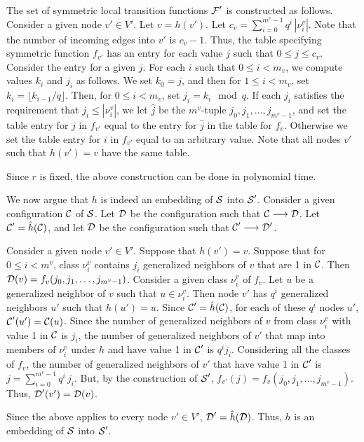 The set of symmetric local transition functions $\mbox{$\mathcal{F}$}'$ is constructed as follows.
Consider a given node $v' \in V'$. Let $v = h(v')$.
Let $c_v = \sum_{i=0}^{m^v-1} q^i \, |\nu_i^v|$.
Note that the number of incoming edges into $v'$ is 
$c_v -1$.
Thus, the table specifying symmetric function $f_{v'}$
has an entry for each value $j$ such that $0 \leq j \leq c_v$.
Consider the entry for a given $j$.
For each $i$ such that $0 \leq i < m_v$,
we compute values $k_i$ and $j_i$ as follows.
We set $k_0 =j$, and then for $1 \leq i < m_v$,
set $k_i = \lfloor k_{i-1}/q \rfloor$.
Then, for $0 \leq i < m_v$, set $j_i = k_i \mod q$.
If each $j_i$ satisfies the requirement that $j_i \leq | \nu_i^v |$,
we let $\hat{j}$ be the $m^v$-tuple $j_0,  j_1, \ldots , j_{m^v -1}$,
and set the table entry for $j$ in $f_{v'}$ equal to the entry for $\hat{j}$ 
 in the table for $f_v$.
Otherwise we set the table entry for $i$ in $f_{v'}$ equal to an arbitrary value.
Note that all nodes $v'$ such that $h(v')=v$ have the same table.

Since $r$ is fixed, the above construction can be done in polynomial time.

We now argue that $h$ is indeed an embedding of $\mbox{$\mathcal{S}$}$ into $\mbox{$\mathcal{S}$}'$.
Consider a given configuration $\mbox{$\mathcal{C}$}$ of $\mbox{$\mathcal{S}$}$.
Let $\mbox{$\mathcal{D}$}$  be the configuration such that $\mbox{$\mathcal{C}$} \longrightarrow \mbox{$\mathcal{D}$}$.
Let $\mbox{$\mathcal{C}$}' =\hat{h}(\mbox{$\mathcal{C}$})$, 
and let $\mbox{$\mathcal{D}$}$  be the configuration such that $\mbox{$\mathcal{C}$}' \longrightarrow \mbox{$\mathcal{D}$}'$.

Consider a given node $v' \in V'$.
Suppose that $h(v') = v$.
Suppose that for $0 \leq i < m^v$,
class $\nu_i^v$ contains $j_i$ generalized neighbors of $v$ that are 1 in $\mbox{$\mathcal{C}$}$.
Then $\mbox{$\mathcal{D}$}(v) = f_v(j_0,  j_1, \ldots , j_{m^v -1})$.
Consider a given class $\nu_i^v$ of $f_v$.
Let $u$ be a generalized neighbor of $v$ such that $ u \in \nu_i^v$.
Then node $v'$ has $q^i$ generalized neighbors $u'$ such that $h(u') = u$.
Since $\mbox{$\mathcal{C}$}' =\hat{h}(\mbox{$\mathcal{C}$})$, for each of these $q^i$ nodes $u'$,
$\mbox{$\mathcal{C}$}'(u') = \mbox{$\mathcal{C}$}(u)$.
Since the number of generalized neighbors of $v$ from class $\nu_i^v$ 
with value 1 in $\mbox{$\mathcal{C}$}$ is $j_i$,
the number of generalized neighbors of $v'$ 
that map into members of $\nu_i^v$ under $h$ and have value 1 in $\mbox{$\mathcal{C}$}'$ is $q^i j_i$.
Considering all the classes of $f_v$,
the number of generalized neighbors of $v'$ that have value 1 in $\mbox{$\mathcal{C}$}'$ is 
$j = \sum_{i=0}^{m^v-1} q^i \, j_i$.
But, by the construction of $\mbox{$\mathcal{S}$}'$,
$f_{v'}(j) = f_v(j_0,  j_1, \ldots , j_{m^v -1})$.
Thus, $\mbox{$\mathcal{D}$}'(v') = \mbox{$\mathcal{D}$}(v)$.

Since the above applies to every node $v' \in V'$,  $\mbox{$\mathcal{D}$}' =\hat{h}(\mbox{$\mathcal{D}$})$.
Thus, $h$ is an embedding of $\mbox{$\mathcal{S}$}$ into $\mbox{$\mathcal{S}$}'$.
\QED

